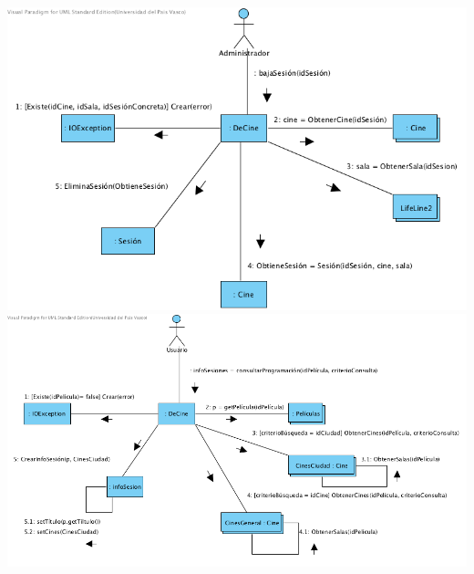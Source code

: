 \documentclass{article}
\begin{document}
\begin{center}
\includegraphics[width=1\linewidth]{./C-4}
\includegraphics[width=1\linewidth]{./C-5}
\end{center}
\end{document}
